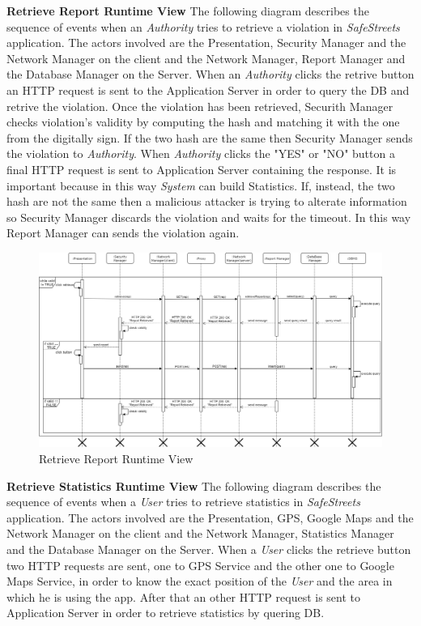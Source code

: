 \documentclass{article}
\begin{document}
\textbf{Retrieve Report Runtime View}
The following diagram describes the sequence of events when an \textit{Authority} tries to retrieve a violation in
\textit{SafeStreets} application. The actors involved are the Presentation, Security Manager and the Network 
Manager on the client and the Network Manager, Report Manager and the Database Manager on the Server.
When an \textit{Authority} clicks the retrive button an HTTP request is sent to the Application Server in order to
query the DB and retrive the violation. Once the violation has been retrieved, Securith Manager checks violation's 
validity by computing the hash and matching it with the one from the digitally sign. If the two hash are the same then
Security Manager sends the violation to \textit{Authority}. When \textit{Authority} clicks the "YES" or "NO" button a final
HTTP request is sent to Application Server containing the response. It is important because in this way \textit{System} can
build Statistics. If, instead, the two hash are not the same then a malicious attacker is trying to alterate information so
Security Manager discards the violation and waits for the timeout. In this way Report Manager can sends the violation again.     

\begin{figure}[H]
    \centering
    \includegraphics[scale=0.4]{img/sequence_diagrams/retrieve_report.png}
    \caption{Retrieve Report Runtime View}
\end{figure}  


\textbf{Retrieve Statistics Runtime View}
The following diagram describes the sequence of events when a \textit{User} tries to retrieve statistics in
\textit{SafeStreets} application. The actors involved are the Presentation, GPS, Google Maps and the Network 
Manager on the client and the Network Manager, Statistics Manager and the Database Manager on the Server.
When a \textit{User} clicks the retrieve button two HTTP requests are sent, one to GPS Service and the other
one to Google Maps Service, in order to know the exact position of the \textit{User} and the area in which he is
using the app. After that an other HTTP request is sent to Application Server in order to retrieve statistics by 
quering DB. 
\end{document}
